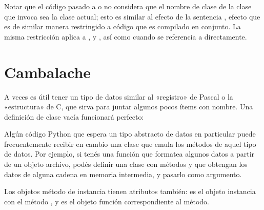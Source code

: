 \documentclass[a4,10pt,spanish]{sphinxmanual}
\begin{document}
\sphinxAtStartPar
Notar que el código pasado a  o  no considera que el nombre de clase de la clase que invoca sea la clase actual; esto es similar al efecto de la sentencia , efecto que es de similar manera restringido a código que es compilado en conjunto.  La misma restricción aplica a ,  y , así como cuando se referencia a  directamente.


\section{Cambalache}
\label{\detokenize{tutorial/classes:odds-and-ends}}\label{\detokenize{tutorial/classes:tut-odds}}
\sphinxAtStartPar
A veces es útil tener un tipo de datos similar al «registro» de Pascal o la «estructura» de C, que sirva para juntar algunos pocos ítems con nombre.  Una definición de clase vacía funcionará perfecto:

\begin{sphinxVerbatim}[commandchars=\\\{\}]
 

    

  
  
  
\end{sphinxVerbatim}

\sphinxAtStartPar
Algún código Python que espera un tipo abstracto de datos en particular puede frecuentemente recibir en cambio una clase que emula los métodos de aquel tipo de datos.  Por ejemplo, si tenés una función que formatea algunos datos a partir de un objeto archivo, podés definir una clase con métodos  y  que obtengan los datos de alguna cadena en memoria intermedia, y pasarlo como argumento.

\sphinxAtStartPar
Los objetos método de instancia tienen atributos también:  es el objeto instancia con el método , y  es el objeto función correspondiente al método.
\end{document}
